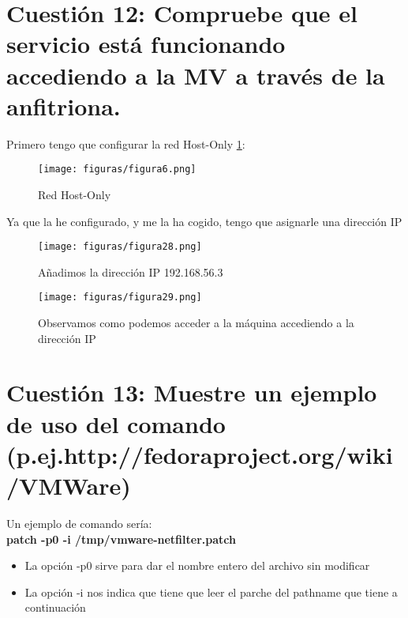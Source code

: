 \section{Cuestión 12: Compruebe que el servicio está funcionando accediendo a la MV a través de la anfitriona.}
Primero tengo que configurar la red Host-Only \ref{figura6}:
\begin{figure}[H] %
	\centering
	\texttt{[image: figuras/figura6.png]}  %
	\label{figura6}
	
	\caption{Red Host-Only} 
\end{figure}

Ya que la he configurado, y me la ha cogido, tengo que asignarle una dirección IP
\begin{figure}[H] %
	\centering
	\texttt{[image: figuras/figura28.png]}  %
	\label{figura28}
	
	\caption{Añadimos la dirección IP 192.168.56.3} 
\end{figure}

\begin{figure}[H] %
	\centering
	\texttt{[image: figuras/figura29.png]}  %
	\label{figura29}
	
	\caption{Observamos como podemos acceder a la máquina accediendo a la dirección IP} 
\end{figure}

\section{Cuestión 13: Muestre un ejemplo de uso del comando (p.ej.http://fedoraproject.org/wiki/VMWare)}

Un ejemplo de comando sería:\\
\textbf{patch -p0 -i /tmp/vmware-netfilter.patch} \cite{fedorapatch}
\begin{itemize}
	\item La opción -p0 sirve para dar el nombre entero del archivo sin modificar \cite{patch}
	\item La opción -i nos indica que tiene que leer el parche del pathname que tiene a continuación \cite{patch}
\end{itemize}

